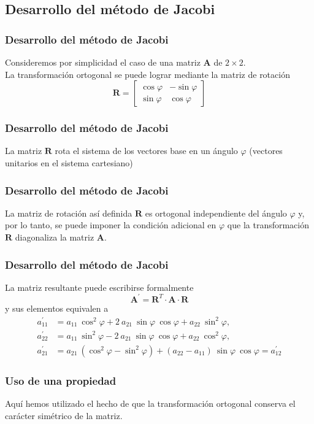 \subsection*{Desarrollo del método de Jacobi}
\begin{frame}
\frametitle{Desarrollo del método de Jacobi}
Consideremos por simplicidad el caso de una matriz $\mathbf{A}$ de $2 \times 2$.
\\
\bigskip
\pause
La transformación ortogonal se puede lograr mediante la matriz de rotación
\begin{equation}
\mathbf{R} = \begin{bmatrix}
\cos \varphi & - \sin \varphi \\
\sin \varphi & \cos \varphi
\end{bmatrix}
\label{eq:ecuacion_08_14}
\end{equation}
\end{frame}
\begin{frame}
\frametitle{Desarrollo del método de Jacobi}
La matriz $\mathbf{R}$ rota el sistema de los vectores base en un ángulo $\varphi$ (vectores unitarios en el sistema cartesiano)
\end{frame}
\begin{frame}
\frametitle{Desarrollo del método de Jacobi}
La matriz de rotación así definida $\mathbf{R}$ es ortogonal independiente del ángulo $\varphi$ y, por lo tanto, se puede imponer la condición adicional en $\varphi$ que la transformación $\mathbf{R}$ diagonaliza la matriz $\mathbf{A}$. 
\end{frame}
\begin{frame}
\frametitle{Desarrollo del método de Jacobi}
La matriz resultante puede escribirse formalmente
\[ \mathbf{A}^{\prime} =  \mathbf{R}^{T} \cdot \mathbf{A} \cdot \mathbf{R} \]
y sus elementos equivalen a
\fontsize{12}{12}\selectfont
\begin{align*}
a^{\prime}_{11} &= a_{11} \: \cos^{2} \varphi + 2 \: a_{21} \: \sin \varphi \: \cos \varphi + a_{22} \: \sin^{2} \varphi, \\
a^{\prime}_{22} &= a_{11} \: \sin^{2} \varphi - 2 \: a_{21} \: \sin \varphi \: \cos \varphi + a_{22} \: \cos^{2} \varphi, \\
a^{\prime}_{21} &= a_{21} \: (\cos^{2} \varphi - \sin^{2} \varphi) + (a_{22} - a_{11}) \: \sin \varphi \: \cos \varphi = a^{\prime}_{12}
\end{align*}
\end{frame}
\begin{frame}
\frametitle{Uso de una propiedad}
Aquí hemos utilizado el hecho de que la transformación ortogonal conserva el carácter simétrico de la matriz.
\end{frame}
